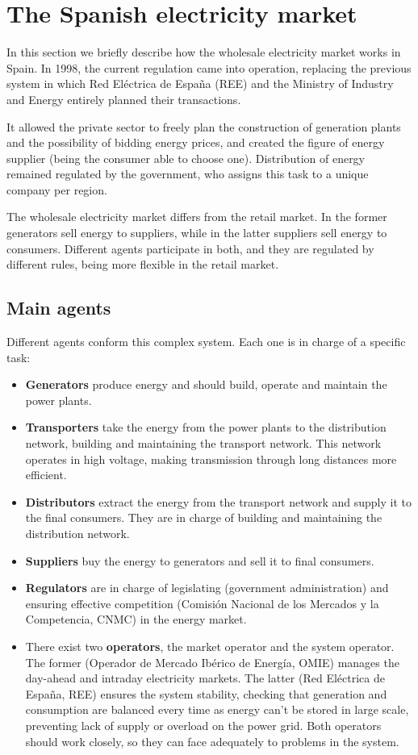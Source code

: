 \chapter{The Spanish electricity market}
In this section we briefly describe how the wholesale electricity market works in Spain.
In 1998, the current regulation came into operation, replacing the previous system in which Red Eléctrica de España (REE) and the Ministry of Industry and Energy entirely planned their transactions.

It allowed the private sector to freely plan the construction of generation plants and the possibility of bidding energy prices, and created the figure of energy supplier (being the consumer able to choose one).
Distribution of energy remained regulated by the government, who assigns this task to a unique company per region. \cite{mercado-electrico-mincotur}

The wholesale electricity market differs from the retail market. In the former generators sell energy to suppliers, while in the latter suppliers sell energy to consumers. Different agents participate in both, and they are regulated by different rules, being more flexible in the retail market.

\section{Main agents}
Different agents conform this complex system. Each one is in charge of a specific task:\cite{mercado-electrico-endesa, organismos-reguladores-holaluz}

\begin{itemize}
    \item \textbf{Generators} produce energy and should build, operate and maintain the power plants.
    \item \textbf{Transporters} take the energy from the power plants to the distribution network, building and maintaining the transport network. This network operates in high voltage, making transmission through long distances more efficient.
    \item \textbf{Distributors} extract the energy from the transport network and supply it to the final consumers. They are in charge of building and maintaining the distribution network.
    \item \textbf{Suppliers} buy the energy to generators and sell it to final consumers.
    \item \textbf{Regulators} are in charge of legislating (government administration) and ensuring effective competition (Comisión Nacional de los Mercados y la Competencia, CNMC) in the energy market.
    \item There exist two \textbf{operators}, the market operator and the system operator. The former (Operador de Mercado Ibérico de Energía, OMIE) manages the day-ahead and intraday electricity markets. The latter (Red Eléctrica de España, REE) ensures the system stability, checking that generation and consumption are balanced every time as energy can't be stored in large scale, preventing lack of supply or overload on the power grid. Both operators should work closely, so they can face adequately to problems in the system.
\end{itemize}

